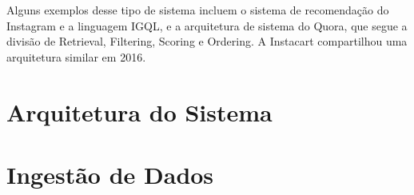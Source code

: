 \documentclass[
	12pt,				%
	openright,			%
	oneside,			%
	a4paper,			%
	english,			%
	french,				%
	spanish,			%
	brazil				%
	]{abntex2}
\begin{document}
Alguns exemplos desse tipo de sistema incluem o sistema de recomendação do Instagram e a linguagem IGQL, e a
arquitetura de sistema do Quora, que segue a divisão de Retrieval, Filtering, Scoring e Ordering. A Instacart
compartilhou uma arquitetura similar em 2016.





\section{Arquitetura do Sistema}\label{sec:arquitetura-do-sistema}

\section{Ingestão de Dados}\label{sec:ingestao-de-dados}
\end{document}
